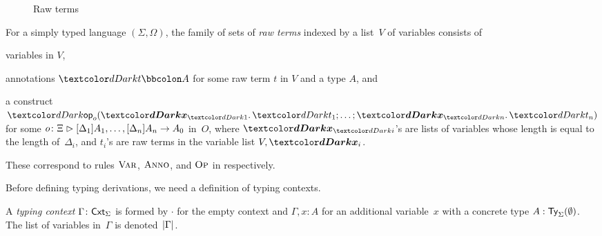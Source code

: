 \begin{definition}
\begin{figure}
  \centering
  \small
  \caption{Raw terms}
  \label{fig:raw-terms}
\end{figure}
  For a simply typed language $(\Sigma, \Omega)$, the family of sets of \emph{raw terms} indexed by a list~$V$ of variables consists of
  \begin{enumerate*}
    \item variables in $V$,
    \item annotations $\isTerm{t \annotate A}$ for some raw term $t$ in $V$ and a type $A$, and
    \item a construct $\tmOpts$ for some $o\colon \Xi \mathrel{\rhd} [\Delta_{1}]A_{1}, \ldots, [\Delta_{n}]A_{n} \to A_0$ in~$O$, where $\vars{x}_{\isTerm{i}}$'s are lists of variables whose length is equal to the length of~$\Delta_i$, and $t_i$'s are raw terms in the variable list $V, \vars{x}_i$.
  \end{enumerate*}
  These correspond to rules $\textnormal{\textsc{Var}}$, $\textnormal{\textsc{Anno}}$, and $\textnormal{\textsc{Op}}$ in  respectively.
\end{definition}

Before defining typing derivations, we need a definition of typing contexts.

\begin{definition}
A \emph{typing context} $\Gamma \colon \mathsf{Cxt}_{\Sigma}$ is formed by $\cdot$ for the empty context and $\Gamma, x : A$ for an additional variable~$x$ with a concrete type $A : \mathsf{Ty}_{\Sigma}(\emptyset)$.
The list of variables in~$\Gamma$ is denoted~$\left|\Gamma\right|$.
\end{definition}

